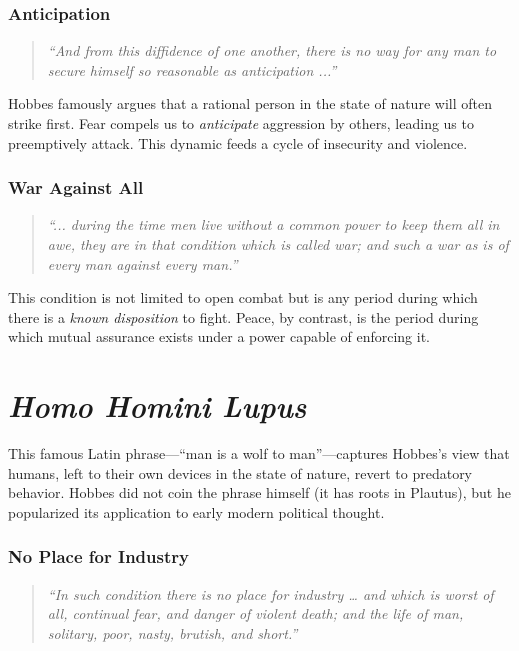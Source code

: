 \subsubsection*{Anticipation}

\begin{quote}
\textit{“And from this diffidence of one another, there is no way for any man to secure himself so reasonable as anticipation ...”}
\end{quote}

Hobbes famously argues that a rational person in the state of nature will often strike first. Fear compels us to \textit{anticipate} aggression by others, leading us to preemptively attack. This dynamic feeds a cycle of insecurity and violence.

\subsubsection*{War Against All}

\begin{quote}
\textit{“... during the time men live without a common power to keep them all in awe, they are in that condition which is called war; and such a war as is of every man against every man.”}
\end{quote}

This condition is not limited to open combat but is any period during which there is a \textit{known disposition} to fight. Peace, by contrast, is the period during which mutual assurance exists under a power capable of enforcing it.

\section*{\textit{Homo Homini Lupus}}

This famous Latin phrase---“man is a wolf to man”---captures Hobbes’s view that humans, left to their own devices in the state of nature, revert to predatory behavior. Hobbes did not coin the phrase himself (it has roots in Plautus), but he popularized its application to early modern political thought.

\subsubsection*{No Place for Industry}

\begin{quote}
\textit{“In such condition there is no place for industry … and which is worst of all, continual fear, and danger of violent death; and the life of man, solitary, poor, nasty, brutish, and short.”}
\end{quote}

